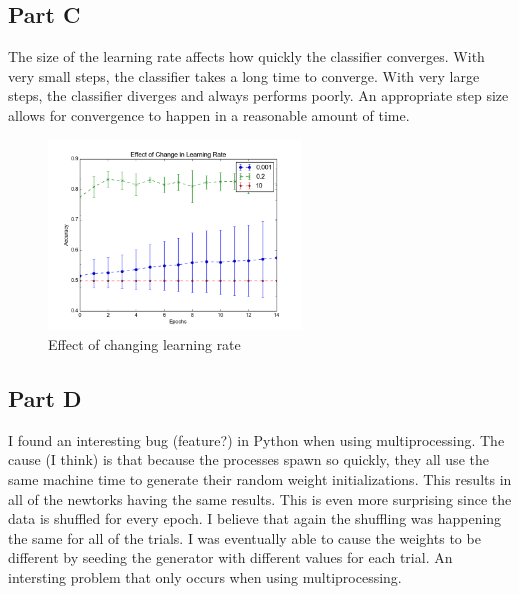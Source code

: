 \subsection{Part C}
The size of the learning rate affects how quickly the classifier converges.  With very small steps, the classifier takes a long time to converge.  With very large steps, the classifier diverges and always performs poorly.  An appropriate step size allows for convergence to happen in a reasonable amount of time.
\begin{figure}[h]
	\centering
	\includegraphics[width=0.6\textwidth]{../train1/learning_rate.png}
	\caption{Effect of changing learning rate}
\end{figure}

\subsection{Part D}
I found an interesting bug (feature?) in Python when using multiprocessing.  The cause (I think) is that because the processes spawn so quickly, they all use the same machine time to generate their random weight initializations.  This results in all of the newtorks having the same results.  This is even more surprising since the data is shuffled for every epoch.  I believe that again the shuffling was happening the same for all of the trials.  I was eventually able to cause the weights to be different by seeding the generator with different values for each trial.  An intersting problem that only occurs when using multiprocessing.

